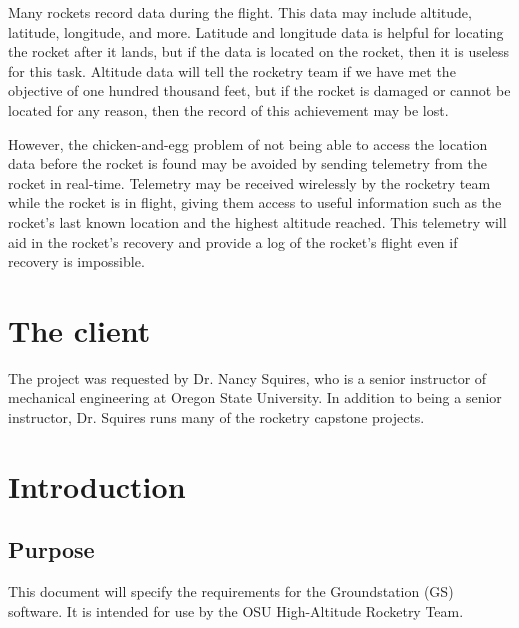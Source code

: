 \documentclass[10pt,draftclsnofoot,onecolumn]{IEEEtran}
\begin{document}
	Many rockets record data during the flight. This data may include
	altitude, latitude, longitude, and more.
	Latitude and longitude
	data is helpful for locating the rocket after it lands, but
	if the data is located on the rocket, then it is useless
	for this task.
	Altitude data will tell the rocketry team if we have
	met the objective of one hundred thousand feet, but if the rocket
	is damaged or cannot be located for any reason, then the record
	of this achievement may be lost.
	
	However, the chicken-and-egg problem of not being able to access
	the location data before the rocket is found may be avoided by sending
	telemetry from the rocket in real-time.
	Telemetry may be received wirelessly
	by the rocketry team while the rocket is in flight, giving them
	access to useful information such as the rocket's last known location
	and the highest altitude reached. This telemetry will aid in the
	rocket's recovery and provide a log of the rocket's flight even if
	recovery is impossible.




	\section{The client}
	The project was requested by Dr. Nancy Squires, who is a senior
	instructor of mechanical engineering at Oregon State University.
	In addition to being a senior instructor, Dr. Squires runs many
	of the rocketry capstone projects.











	\section{Introduction}
	
	\subsection{Purpose}
	This document will specify the requirements for the Groundstation (GS) software.
	It is intended for use by the OSU High-Altitude Rocketry Team.
	
\end{document}
